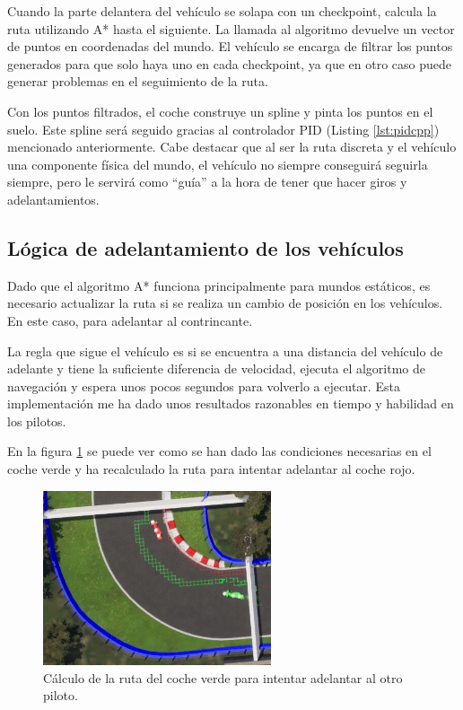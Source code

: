Cuando la parte delantera del vehículo se solapa con un checkpoint, calcula la ruta utilizando A* hasta el siguiente. La llamada al algoritmo devuelve un vector de puntos en coordenadas del mundo. El vehículo se encarga de filtrar los puntos generados para que solo haya uno en cada checkpoint, ya que en otro caso puede generar problemas en el seguimiento de la ruta.

\bigskip

Con los puntos filtrados, el coche construye un spline y pinta los puntos en el suelo. Este spline será seguido gracias al controlador PID (Listing \ref{lst:pidcpp}) mencionado anteriormente. Cabe destacar que al ser la ruta discreta y el vehículo una componente física del mundo, el vehículo no siempre conseguirá seguirla siempre, pero le servirá como ``guía'' a la hora de tener que hacer giros y adelantamientos.

\newpage

\subsection{Lógica de adelantamiento de los vehículos}


Dado que el algoritmo A* funciona principalmente para mundos estáticos, es necesario actualizar la ruta si se realiza un cambio de posición en los vehículos. En este caso, para adelantar al contrincante.

\bigskip

La regla que sigue el vehículo es si se encuentra a una distancia del vehículo de adelante y tiene la suficiente diferencia de velocidad, ejecuta el algoritmo de navegación y espera unos pocos segundos para volverlo a ejecutar. Esta implementación me ha dado unos resultados razonables en tiempo y habilidad en los pilotos.

\bigskip

En la figura \ref{fig:overtake} se puede ver como se han dado las condiciones necesarias en el coche verde y ha recalculado la ruta para intentar adelantar al coche rojo.

\begin{figure}[H]
    \centering
    \includegraphics[width=0.6\textwidth]{imagenes/converted/overtake.jpg}
    \caption{Cálculo de la ruta del coche verde para intentar adelantar al otro piloto.}
    \label{fig:overtake}
\end{figure}

